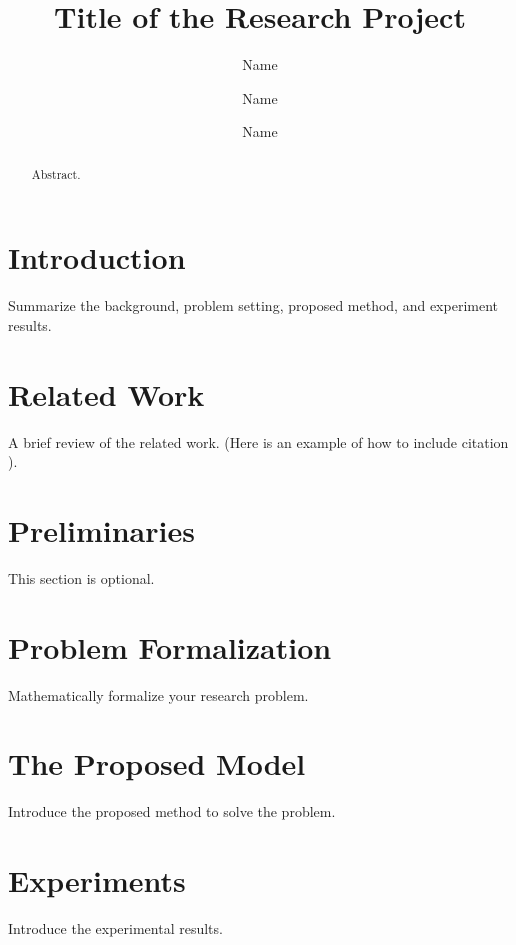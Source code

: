 \documentclass[sigconf]{acmart}
\begin{document}
\title{Title of the Research Project}
\author{Name}

\author{Name}

\author{Name}


\begin{abstract}
Abstract.
\end{abstract}


\maketitle

\section{Introduction}
Summarize the background, problem setting, proposed method, and experiment results.

\section{Related Work}\label{sec:related}
A brief review of the related work. (Here is an example of how to include citation \cite{koren2009matrix}).


\section{Preliminaries}\label{sec:preliminary}
This section is optional.

\section{Problem Formalization}\label{sec:formal}
Mathematically formalize your research problem.

\section{The Proposed Model}\label{sec:framework}
Introduce the proposed method to solve the problem.

\section{Experiments}\label{sec:experiments}
Introduce the experimental results.
\end{document}
